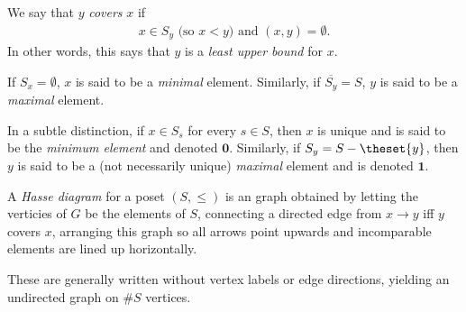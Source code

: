 \begin{definition}[Covering]

We say that \(y\) \emph{covers} \(x\) if
\begin{align*}
x \in S_y \text{ (so $x < y$) and } (x,y) = \emptyset.
\end{align*} In other words, this says that \(y\) is a \emph{least upper
bound} for \(x\).

\end{definition}

\begin{definition}

If \(S_x = \emptyset\), \(x\) is said to be a \emph{minimal} element.
Similarly, if \(\overline{S_y} = S\), \(y\) is said to be a
\emph{maximal} element.

\end{definition}

\begin{remark}

In a subtle distinction, if \(x \in S_s\) for every \(s\in S\), then
\(x\) is unique and is said to be the \emph{minimum element} and denoted
\(\mathbf 0\). Similarly, if \(S_y = S-\theset{y}\), then \(y\) is said
to be a (not necessarily unique) \emph{maximal} element and is denoted
\(\mathbf 1\).

\end{remark}

\begin{definition}

A \emph{Hasse diagram} for a poset \((S, \leq)\) is an graph obtained by
letting the verticies of \(G\) be the elements of \(S\), connecting a
directed edge from \(x\to y\) iff \(y\) covers \(x\), arranging this
graph so all arrows point upwards and incomparable elements are lined up
horizontally.

\end{definition}

\begin{remark}

These are generally written without vertex labels or edge directions,
yielding an undirected graph on \(\# S\) vertices.

\end{remark}

